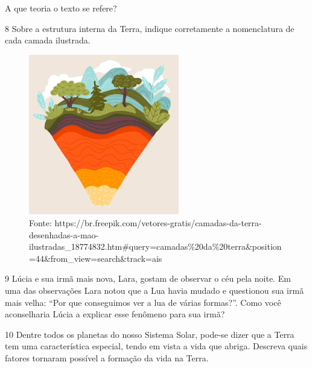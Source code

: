 A que teoria o texto se refere?



\num{8} Sobre a estrutura interna da Terra, indique corretamente a nomenclatura de cada camada ilustrada.

\begin{figure}[htpb!]
\includegraphics[width=2.58803in,height=2.75652in]{./imgs/img11.png}
\caption{Fonte: https://br.freepik.com/vetores-gratis/camadas-da-terra-desenhadas-a-mao-ilustradas\_18774832.htm\#query=camadas\%20da\%20terra\&position=44\&from\_view=search\&track=ais}
\end{figure}



\num{9}  Lúcia e sua irmã mais nova, Lara, gostam de observar o céu pela noite.
  Em uma das observações Lara notou que a Lua havia mudado e questionou
  sua irmã mais velha: ``Por que conseguimos ver a lua de várias
  formas?''. Como você aconselharia Lúcia a explicar esse fenômeno para sua irmã?



\num{10}  Dentre todos os planetas do nosso Sistema Solar, pode-se dizer que a
  Terra tem uma característica especial, tendo em vista a vida que
  abriga. Descreva quais fatores tornaram possível a formação da vida na Terra.



